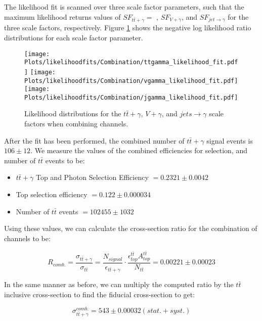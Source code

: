 The likelihood fit is scanned over three scale factor parameters, such that the maximum likelihood returns values of $SF_{t\bar{t}+\gamma} = $ , $SF_{V+\gamma}$, and $SF_{jet\to\gamma}$  for the three scale factors, respectively. Figure \ref{fig-SFLikelihoodFitsCombination} shows the negative log likelihood ratio distributions for each scale factor parameter.  

\begin{figure}
\texttt{[image: Plots/likelihoodfits/Combination/ttgamma\_likelihood\_fit.pdf]}
\texttt{[image: Plots/likelihoodfits/Combination/vgamma\_likelihood\_fit.pdf]}
\texttt{[image: Plots/likelihoodfits/Combination/jgamma\_likelihood\_fit.pdf]}
\caption{Likelihood distributions for the $t\bar{t}+\gamma$, $V+\gamma$, and $jets\to \gamma$ scale factors when combining channels.}
\label{fig-SFLikelihoodFitsCombination}
\end{figure}

After the fit has been performed, the combined number of $t\bar{t}+\gamma$ signal events is $106 \pm 12$. We measure the values of the combined efficiencies for selection, and number of $t\bar{t}$ events to be:

\begin{itemize}
	\item $t\bar{t}+\gamma$ Top and Photon Selection Efficiency $= 0.2321 \pm 0.0042$
	\item Top selection efficiency $= 0.122 \pm 0.000034$
	\item Number of $t\bar{t}$ events $= 102455 \pm 1032$
\end{itemize}

Using these values, we can calculate the cross-section ratio for the combination of channels to be:

\begin{equation}
	R_{comb.} = \frac{\sigma_{t\bar{t}+\gamma}}{\sigma_{t\bar{t}}} = \frac{N_{signal}}{\epsilon_{t\bar{t}+\gamma}} \cdot \frac{\epsilon^{t\bar{t}}_{top} A^{t\bar{t}}_{top}}{N_{t\bar{t}}} = 0.00221 \pm 0.00023
\end{equation}

In the same manner as before, we can multiply the computed ratio by the $t\bar{t}$ inclusive cross-section to find the fiducial cross-section to get:

\begin{equation}
	\sigma_{t\bar{t}+\gamma}^{comb.} = 543 \pm 0.00032 (stat.+syst.)
\end{equation}

